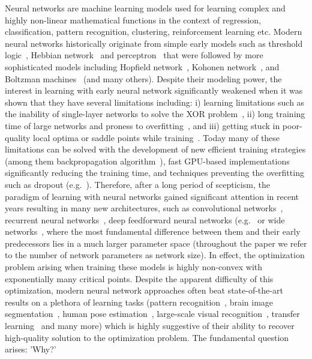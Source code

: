 \documentclass[twoside]{article}
\begin{document}
Neural networks are machine learning models used for learning complex and highly non-linear mathematical functions in the context of regression, classification, pattern recognition, clustering, reinforcement learning etc. Modern neural networks historically originate from simple early models such as threshold logic~\cite{mcculloch43a}, Hebbian network~\cite{Hebb:1949} and perceptron~\cite{rosenblatt58a} that were followed by more sophisticated models including Hopfield network~\cite{Hopfield:1988:NNP:65669.104422}, Kohonen network~\cite{Kohonen1982}, and Boltzman machines~\cite{Hinton:1986:LRB:104279.104291} (and many others). Despite their modeling power, the interest in learning with early neural network significantly weakened when it was shown that they have several limitations including: i) learning limitations such as the inability of single-layer networks to solve the XOR problem~\cite{minsky69perceptrons}, ii) long training time of large networks and proness to overfitting~\cite{JMLR:v15:srivastava14a}, and iii) getting stuck in poor-quality local optima or saddle points while training~\cite{Larochelle:2009:EST:1577069.1577070}. Today many of these limitations can be solved with the development of new efficient training strategies (among them backpropagation algorithm~\cite{Werbos:74}), fast GPU-based implementations significantly reducing the training time, and techniques preventing the overfitting such as dropout (e.g.~\cite{journals/corr/abs-1207-0580,JMLR:v15:srivastava14a}). Therefore, after a long period of scepticism, the paradigm of learning with neural networks gained significant attention in recent years resulting in many new architectures, such as convolutional networks~\cite{lecun-gradientbased-learning-applied-1998}, recurrent neural networks~\cite{Graves:2009:NCS:1525650.1525782}, deep feedforward neural networks (e.g.~\cite{DBLP:journals/corr/Schmidhuber14} or wide networks~\cite{Huang14}, where the most fundamental difference between them and their early predecessors lies in a much larger parameter space (throughout the paper we refer to the number of network parameters as network size). In effect, the optimization problem arising when training these models is highly non-convex with exponentially many critical points. Despite the apparent difficulty of this optimization, modern neural network approaches often beat state-of-the-art results on a plethora of learning tasks (pattern recognition~\cite{journals/nn/CiresanMMS12}, brain image segmentation~\cite{NIPS2012_4741}, human pose estimation~\cite{DBLP:journals/corr/TompsonJLB14}, large-scale visual recognition~\cite{sermanet-iclr-14}, transfer learning~\cite{conf/icml/GoodfellowCB12} and many more) which is highly suggestive of their ability to recover high-quality solution to the optimization problem. The fundamental question arises: 'Why?' 
\end{document}
